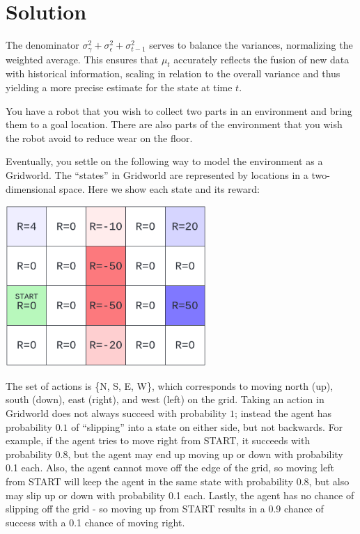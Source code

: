 \documentclass[submit]{harvardml}
\newenvironment{solution}
  {\color{blue}\section*{Solution}}
{}
\begin{document}
\begin{solution}
\begin{enumerate}
The denominator \( \sigma_{\gamma}^2 + \sigma_{\epsilon}^2 + \sigma_{t-1}^2 \) serves to balance the variances, normalizing the weighted average. This ensures that \( \mu_t \) accurately reflects the fusion of new data with historical information, scaling in relation to the overall variance and thus yielding a more precise estimate for the state at time \( t \).

\end{enumerate}
	
\end{solution}

\newpage

\begin{problem}

You have a robot that you wish to collect two parts in an environment
and bring them to a goal location.  There are also parts of the
environment that you wish the robot avoid to reduce wear on the floor.

Eventually, you settle on the following way to model the environment
as a Gridworld.  The ``states'' in Gridworld are represented by
locations in a two-dimensional space.  Here we show each state and its
reward:

\begin{center}
\includegraphics[width=3in]{images/gridworld.png}
\end{center}

The set of actions is \{N, S, E, W\}, which corresponds to moving north (up), south (down), east (right), and west (left) on the grid. Taking an action in Gridworld does not always succeed with probability
$1$; instead the agent has probability $0.1$ of ``slipping'' into a
state on either side, but not backwards.  For example, if the agent tries to move right from START, it succeeds with probability 0.8, but the agent may end up moving up or down with probability 0.1 each. Also, the agent cannot move off the edge of the grid, so moving left from START will keep the agent in the same state with probability 0.8, but also may slip up or down with probability 0.1 each. Lastly, the agent has no chance of slipping off the grid - so moving up from START results in a 0.9 chance of success with a 0.1 chance of moving right.


\end{problem}
\end{document}
